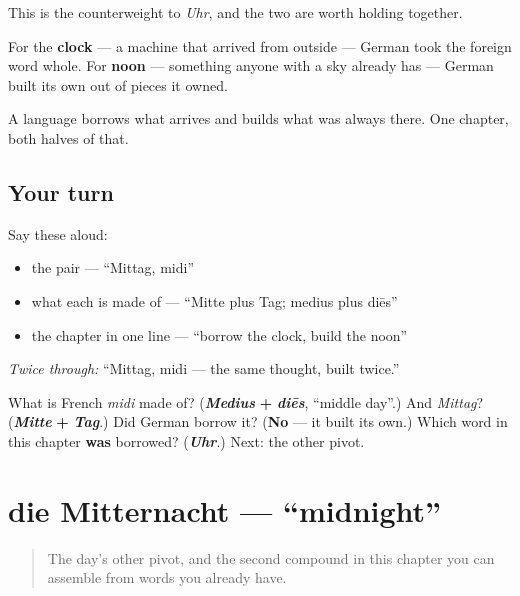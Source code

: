 \begin{culture}
This is the counterweight to \emph{Uhr}, and the two are worth holding together.

For the \textbf{clock} — a machine that arrived from outside — German took the foreign word whole. For \textbf{noon} — something anyone with a sky already has — German built its own out of pieces it owned.

A language borrows what arrives and builds what was always there. One chapter, both halves of that.
\end{culture}

\subsection*{Your turn}
Say these aloud:

\begin{itemize}
\raggedright
  \item the pair — \textquotedblleft{}Mittag, midi\textquotedblright{}
  \item what each is made of — \textquotedblleft{}Mitte plus Tag; medius plus diēs\textquotedblright{}
  \item the chapter in one line — \textquotedblleft{}borrow the clock, build the noon\textquotedblright{}
\end{itemize}

\emph{Twice through:} \textquotedblleft{}Mittag, midi — the same thought, built twice.\textquotedblright{}

\begin{tcolorbox}[breakable,colback=teal!4,colframe=teal!35!black,title={Before you move on}]
What is French \emph{midi} made of? (\emph{\textbf{Medius}} \textbf{+} \emph{\textbf{diēs}}, \textquotedblleft{}middle day\textquotedblright{}.) And \emph{Mittag}? (\emph{\textbf{Mitte}} \textbf{+} \emph{\textbf{Tag}}.) Did German borrow it? (\textbf{No} — it built its own.) Which word in this chapter \textbf{was} borrowed? (\emph{\textbf{Uhr}}.) Next: the other pivot.
\end{tcolorbox}
\section[die Mitternacht]{die Mitternacht — \textquotedblleft{}midnight\textquotedblright{}}

\label{lesson:GE-C08-mitternacht}



\begin{quote}
The day's other pivot, and the second compound in this chapter you can assemble from words you already have.
\end{quote}

